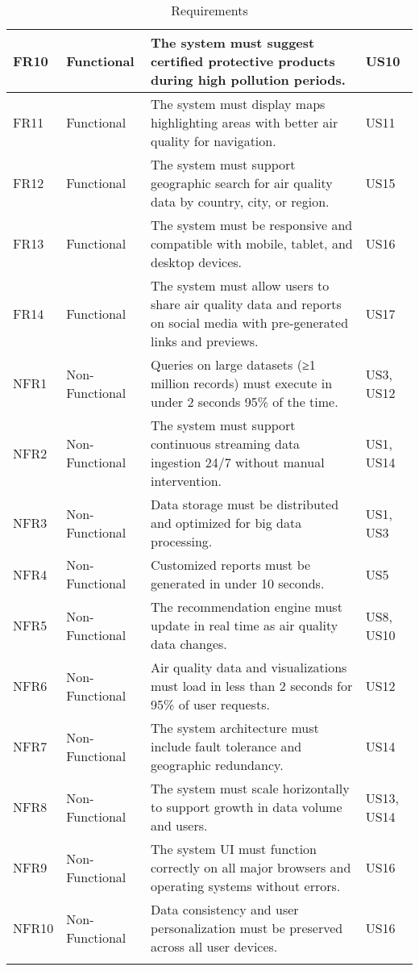 \begin{longtable}{|p{2cm}|p{2cm}|p{8cm}|p{3cm}|}
FR10 & Functional & The system must suggest certified protective products during high pollution periods. & US10 \\ 
\hline

FR11 & Functional & The system must display maps highlighting areas with better air quality for navigation. & US11 \\ 
\hline

FR12 & Functional & The system must support geographic search for air quality data by country, city, or region. & US15 \\ 
\hline

FR13 & Functional & The system must be responsive and compatible with mobile, tablet, and desktop devices. & US16 \\ 
\hline

FR14 & Functional & The system must allow users to share air quality data and reports on social media with pre-generated links and previews. & US17 \\ 
\hline

NFR1 & Non-Functional & Queries on large datasets (≥1 million records) must execute in under 2 seconds 95\% of the time. & US3, US12 \\ 
\hline

NFR2 & Non-Functional & The system must support continuous streaming data ingestion 24/7 without manual intervention. & US1, US14 \\ 
\hline

NFR3 & Non-Functional & Data storage must be distributed and optimized for big data processing. & US1, US3 \\ 
\hline

NFR4 & Non-Functional & Customized reports must be generated in under 10 seconds. & US5 \\ 
\hline

NFR5 & Non-Functional & The recommendation engine must update in real time as air quality data changes. & US8, US10 \\ 
\hline

NFR6 & Non-Functional & Air quality data and visualizations must load in less than 2 seconds for 95\% of user requests. & US12 \\ 
\hline

NFR7 & Non-Functional & The system architecture must include fault tolerance and geographic redundancy. & US14 \\ 
\hline

NFR8 & Non-Functional & The system must scale horizontally to support growth in data volume and users. & US13, US14 \\ 
\hline

NFR9 & Non-Functional & The system UI must function correctly on all major browsers and operating systems without errors. & US16 \\ 
\hline

NFR10 & Non-Functional & Data consistency and user personalization must be preserved across all user devices. & US16 \\ 
\hline

\caption{Requirements}
\end{longtable}


